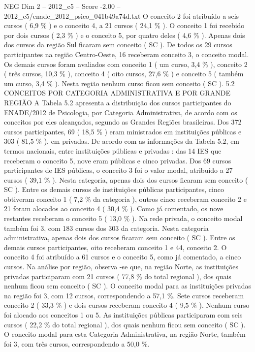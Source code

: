 \begin{textsample}{NEG Dim 2 – 2012\_c5 – Score -2.00 – 2012\_c5/enade\_2012\_psico\_041b49a74d.txt}
O conceito 2 foi atribuído a seis cursos ( 6,9 \% ) e o conceito 4, a 21 cursos ( 24,1 \% ).
O conceito 1 foi recebido por dois cursos ( 2,3 \% ) e o conceito 5, por quatro deles ( 4,6 \% ).
Apenas dois dos cursos da região Sul ficaram sem conceito ( SC ).
De todos os 29 cursos participantes na região Centro-Oeste, 16 receberam conceito 3, o conceito modal.
Os demais cursos foram avaliados com conceito 1 ( um curso, 3,4 \% ), conceito 2 ( três cursos, 10,3 \% ), conceito 4 ( oito cursos, 27,6 \% ) e conceito 5 ( também um curso, 3,4 \% ).
Nesta região nenhum curso ficou sem conceito ( SC ). 5.2 CONCEITOS POR CATEGORIA ADMINISTRATIVA E POR GRANDE REGIÃO A Tabela 5.2 apresenta a distribuição dos cursos participantes do ENADE/2012 de Psicologia, por Categoria Administrativa, de acordo com os conceitos por eles alcançados, segundo as Grandes Regiões brasileiras.
Dos 372 cursos participantes, 69 ( 18,5 \% ) eram ministrados em instituições públicas e 303 ( 81,5 \% ), em privadas.
De acordo com as informações da Tabela 5.2, em termos nacionais, entre instituições públicas e privadas : das 14 IES que receberam o conceito 5, nove eram públicas e cinco privadas.
Dos 69 cursos participantes de IES públicas, o conceito 3 foi o valor modal, atribuído a 27 cursos ( 39,1 \% ).
Nesta categoria, apenas dois dos cursos ficaram sem conceito ( SC ).
Entre os demais cursos de instituições públicas participantes, cinco obtiveram conceito 1 ( 7,2 \% da categoria ), outros cinco receberam conceito 2 e 21 foram alocados ao conceito 4 ( 30,4 \% ).
Como já comentado, os nove restantes receberam o conceito 5 ( 13,0 \% ).
Na rede privada, o conceito modal também foi 3, com 183 cursos dos 303 da categoria.
Nesta categoria administrativa, apenas dois dos cursos ficaram sem conceito ( SC ).
Entre os demais cursos participantes, oito receberam conceito 1 e 44, conceito 2.
O conceito 4 foi atribuído a 61 cursos e o conceito 5, como já comentado, a cinco cursos.
Na análise por região, observa -se que, na região Norte, as instituições privadas participaram com 21 cursos ( 77,8 \% do total regional ), dos quais nenhum ficou sem conceito ( SC ).
O conceito modal para as instituições privadas na região foi 3, com 12 cursos, correspondendo a 57,1 \%.
Sete cursos receberam conceito 2 ( 33,3 \% ) e dois cursos receberam conceito 4 ( 9,5 \% ).
Nenhum curso foi alocado aos conceitos 1 ou 5.
As instituições públicas participaram com seis cursos ( 22,2 \% do total regional ), dos quais nenhum ficou sem conceito ( SC ).
O conceito modal para esta Categoria Administrativa, na região Norte, também foi 3, com três cursos, correspondendo a 50,0 \%.

\end{textsample}
